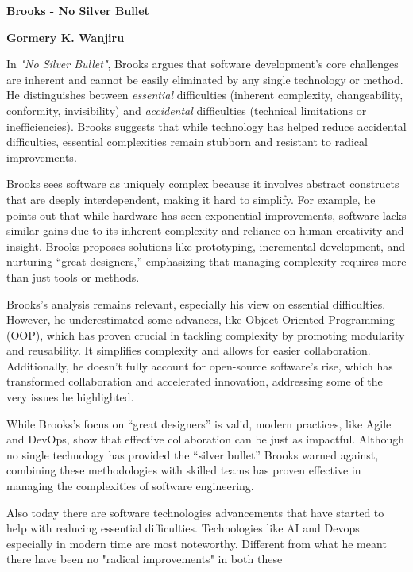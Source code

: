 \documentclass[a4paper, 12pt]{article}
\begin{document}
\noindent
\textbf{Brooks - No Silver Bullet}

\vspace{0.5cm}

\textbf{Gormery K. Wanjiru}

\vspace{0.5cm}

In \textit{"No Silver Bullet"}, Brooks argues that software development’s core challenges are inherent and cannot be easily eliminated by any single technology or method. He distinguishes between \textit{essential} difficulties (inherent complexity, changeability, conformity, invisibility) and \textit{accidental} difficulties (technical limitations or inefficiencies). Brooks suggests that while technology has helped reduce accidental difficulties, essential complexities remain stubborn and resistant to radical improvements.

Brooks sees software as uniquely complex because it involves abstract constructs that are deeply interdependent, making it hard to simplify. For example, he points out that while hardware has seen exponential improvements, software lacks similar gains due to its inherent complexity and reliance on human creativity and insight. Brooks proposes solutions like prototyping, incremental development, and nurturing “great designers,” emphasizing that managing complexity requires more than just tools or methods.

\vspace{0.5cm}

Brooks’s analysis remains relevant, especially his view on essential difficulties. However, he underestimated some advances, like Object-Oriented Programming (OOP), which has proven crucial in tackling complexity by promoting modularity and reusability. It simplifies complexity and allows for easier collaboration. Additionally, he doesn’t fully account for open-source software's rise, which has transformed collaboration and accelerated innovation, addressing some of the very issues he highlighted.

While Brooks’s focus on “great designers” is valid, modern practices, like Agile and DevOps, show that effective collaboration can be just as impactful. Although no single technology has provided the “silver bullet” Brooks warned against, combining these methodologies with skilled teams has proven effective in managing the complexities of software engineering.

Also today there are software technologies advancements that have started to help with reducing essential difficulties. Technologies like AI and Devops especially in modern time are most noteworthy. Different from what he meant there have been no "radical improvements" in both these
\end{document}
